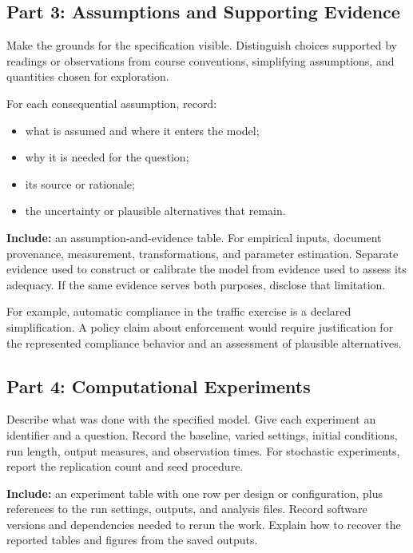 \documentclass[11pt,a4paper]{article}
\begin{document}
\subsection{Part 3: Assumptions and Supporting Evidence}

Make the grounds for the specification visible. Distinguish choices supported by readings or observations from course conventions, simplifying assumptions, and quantities chosen for exploration.

For each consequential assumption, record:
\begin{itemize}
\item what is assumed and where it enters the model;
\item why it is needed for the question;
\item its source or rationale;
\item the uncertainty or plausible alternatives that remain.
\end{itemize}

\textbf{Include:} an assumption-and-evidence table. For empirical inputs, document provenance, measurement, transformations, and parameter estimation. Separate evidence used to construct or calibrate the model from evidence used to assess its adequacy. If the same evidence serves both purposes, disclose that limitation.

For example, automatic compliance in the traffic exercise is a declared simplification. A policy claim about enforcement would require justification for the represented compliance behavior and an assessment of plausible alternatives.

\subsection{Part 4: Computational Experiments}

Describe what was done with the specified model. Give each experiment an identifier and a question. Record the baseline, varied settings, initial conditions, run length, output measures, and observation times. For stochastic experiments, report the replication count and seed procedure.

\textbf{Include:} an experiment table with one row per design or configuration, plus references to the run settings, outputs, and analysis files. Record software versions and dependencies needed to rerun the work. Explain how to recover the reported tables and figures from the saved outputs.
\end{document}
